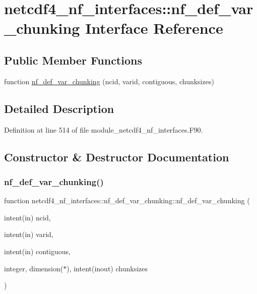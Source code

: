 \hypertarget{interfacenetcdf4__nf__interfaces_1_1nf__def__var__chunking}{}\section{netcdf4\+\_\+nf\+\_\+interfaces\+:\+:nf\+\_\+def\+\_\+var\+\_\+chunking Interface Reference}
\label{interfacenetcdf4__nf__interfaces_1_1nf__def__var__chunking}
\subsection*{Public Member Functions}
\begin{DoxyCompactItemize}
\item 
function \hyperlink{interfacenetcdf4__nf__interfaces_1_1nf__def__var__chunking_a49d0f9dd5b48b4cba7a53dbce211748b}{nf\+\_\+def\+\_\+var\+\_\+chunking} (ncid, varid, contiguous, chunksizes)
\end{DoxyCompactItemize}


\subsection{Detailed Description}


Definition at line 514 of file module\+\_\+netcdf4\+\_\+nf\+\_\+interfaces.\+F90.



\subsection{Constructor \& Destructor Documentation}
\mbox{\label{interfacenetcdf4__nf__interfaces_1_1nf__def__var__chunking_a49d0f9dd5b48b4cba7a53dbce211748b}} 
\subsubsection{\texorpdfstring{nf\+\_\+def\+\_\+var\+\_\+chunking()}{nf\_def\_var\_chunking()}}
{\footnotesize\ttfamily function netcdf4\+\_\+nf\+\_\+interfaces\+::nf\+\_\+def\+\_\+var\+\_\+chunking\+::nf\+\_\+def\+\_\+var\+\_\+chunking (\begin{DoxyParamCaption}\item[{intent(in)}]{ncid,  }\item[{intent(in)}]{varid,  }\item[{intent(in)}]{contiguous,  }\item[{integer, dimension($\ast$), intent(inout)}]{chunksizes }\end{DoxyParamCaption})}



